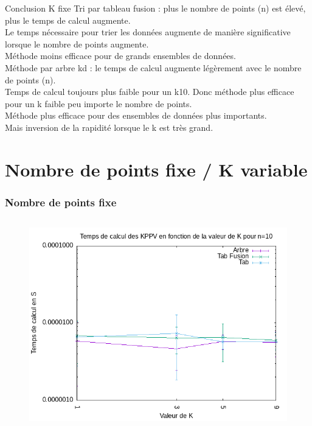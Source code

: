 \documentclass{beamer}
\begin{document}
\begin{frame}
\begin{block}{Conclusion K fixe}
Tri par tableau fusion : plus le nombre de points (n) est élevé, plus le temps de calcul augmente.\\
Le temps nécessaire pour trier les données augmente de manière significative lorsque le nombre de points augmente.\\
Méthode moins efficace pour de grands ensembles de données.\\

Méthode par arbre kd : le temps de calcul augmente légèrement avec le nombre de points (n).\\
Temps de calcul toujours plus faible pour un k\textlangle{}10. Donc méthode plus efficace pour un k faible peu importe le nombre de points.\\
Méthode plus efficace pour des ensembles de données plus importants.\\
Mais inversion de la rapidité lorsque le k est très grand.

\end{block}
\end{frame}

\section{Nombre de points fixe / K variable}

\begin{frame}
\frametitle{Nombre de points fixe}
\begin{columns}
    \begin{figure}
      \includegraphics[width=\textwidth]{img_graph/graph_n_10.png}
    \end{figure}
\end{columns}
\end{frame}
\end{document}
